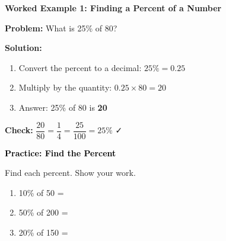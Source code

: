 \documentclass[12pt, letterpaper, fleqn]{article}
\newcommand{\blank}{\underline{\hspace{2.2cm}}}
\begin{document}
\begin{tcolorbox}[colback=white, colframe=black!25, boxrule=0.6pt, arc=4mm, left=6mm, right=6mm, top=5mm, bottom=5mm]

\textbf{Worked Example 1: Finding a Percent of a Number}

\medskip

\textbf{Problem:} What is 25\% of 80?

\medskip

\noindent
\textbf{Solution:}

\begin{enumerate}
    \item Convert the percent to a decimal: $25\% = 0.25$
    
    \item Multiply by the quantity: $0.25 \times 80 = 20$
    
    \item Answer: 25\% of 80 is \textbf{20}
\end{enumerate}

\medskip

\noindent
\textbf{Check:} $\dfrac{20}{80} = \dfrac{1}{4} = \dfrac{25}{100} = 25\%$ ✓

\end{tcolorbox}

\vspace{4mm}

\begin{tcolorbox}[colback=customteal!20]
\large\textcolor{black}{\textbf{Practice: Find the Percent}}
\end{tcolorbox}

\noindent
Find each percent. Show your work.

\vspace{3mm}

\begin{enumerate}[itemsep=1.5cm, leftmargin=0.6cm]

\item 10\% of 50 = \blank

\item 50\% of 200 = \blank

\item 20\% of 150 = \blank

\end{enumerate}

\newpage
\end{document}
